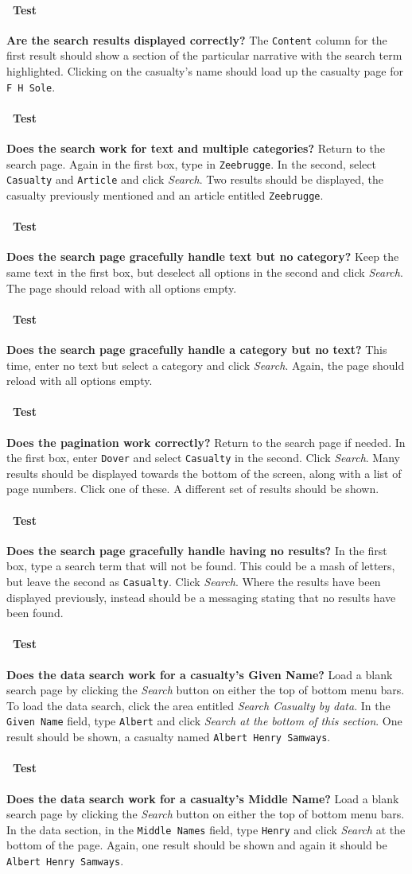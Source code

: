 \documentclass[12pt]{article}
\newcounter{Test}
\newcommand{\test}[1]{%
\stepcounter{Test}%
\paragraph{\Circle\ Test \theTest} \textbf{#1} }
\begin{document}
\test{Are the search results displayed correctly?}
The \texttt{Content} column for the first result should show a section of the particular narrative with the search term highlighted. Clicking on the casualty's name should load up the casualty page for \texttt{F H Sole}.

\test{Does the search work for text and multiple categories?}
Return to the search page. Again in the first box, type in \texttt{Zeebrugge}. In the second, select \texttt{Casualty} and \texttt{Article} and click \textit{Search}. Two results should be displayed, the casualty previously mentioned and an article entitled \texttt{Zeebrugge}.

\test{Does the search page gracefully handle text but no category?}
Keep the same text in the first box, but deselect all options in the second and click \textit{Search}. The page should reload with all options empty.

\test{Does the search page gracefully handle a category but no text?}
This time, enter no text but select a category and click \textit{Search}. Again, the page should reload with all options empty.

\test{Does the pagination work correctly?}
Return to the search page if needed. In the first box, enter \texttt{Dover} and select \texttt{Casualty} in the second. Click \textit{Search}. Many results should be displayed towards the bottom of the screen, along with a list of page numbers. Click one of these. A different set of results should be shown.

\test{Does the search page gracefully handle having no results?}
In the first box, type a search term that will not be found. This could be a mash of letters, but leave the second as \texttt{Casualty}. Click \textit{Search}. Where the results have been displayed previously, instead should be a messaging stating that no results have been found.

\test{Does the data search work for a casualty's Given Name?}
Load a blank search page by clicking the \textit{Search} button on either the top of bottom menu bars. To load the data search, click the area entitled \textit{Search Casualty by data}. In the \texttt{Given Name} field, type \texttt{Albert} and click \textit{Search at the bottom of this section}. One result should be shown, a casualty named \texttt{Albert Henry Samways}.

\test{Does the data search work for a casualty's Middle Name?}
Load a blank search page by clicking the \textit{Search} button on either the top of bottom menu bars. In the data section, in the \texttt{Middle Names} field, type \texttt{Henry} and click \textit{Search} at the bottom of the page. Again, one result should be shown and again it should be \texttt{Albert Henry Samways}.
\end{document}
